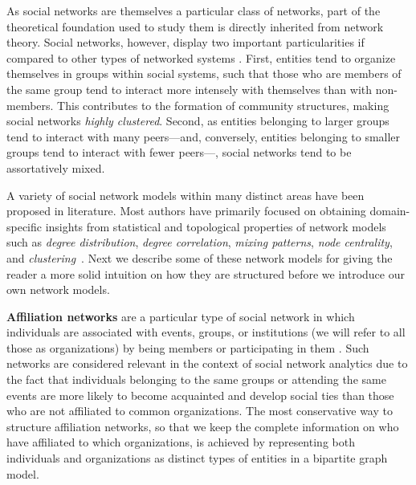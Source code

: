 As social networks are themselves a particular class of networks, part of the theoretical foundation used to study them is directly inherited from network theory.
%
Social networks, however, display two important particularities if compared to other types of networked systems \cite{Newman2003d}.
First, entities tend to organize themselves in groups within social systems, such that those who are members of the same group tend to interact more intensely with themselves than with non-members.
This contributes to the formation of community structures, making social networks \textit{highly clustered}.
Second, as entities belonging to larger groups tend to interact with many peers---and, conversely, entities belonging to smaller groups tend to interact with fewer peers---, social networks tend to be assortatively mixed.

A variety of social network models within many distinct areas have been proposed in literature.
Most authors have primarily focused on obtaining domain-specific insights from statistical and topological properties of network models such as \textit{degree distribution}, \textit{degree correlation}, \textit{mixing patterns}, \textit{node centrality}, and \textit{clustering}~\cite{Newman2003b}.
Next we describe some of these network models for giving the reader a more solid intuition on how they are structured before we introduce our own network models.


\textbf{Affiliation networks} are a particular type of social network in which individuals are associated with events, groups, or institutions (we will refer to all those as organizations) by being members or participating in them \cite{Borgatti2015}. 
%
Such networks are considered relevant in the context of social network analytics due to the fact that individuals belonging to the same groups or attending the same events are more likely to become acquainted and develop social ties than those who are not affiliated to common organizations.
%
The most conservative way to structure affiliation networks, so that we keep the complete information on who have affiliated to which organizations, is achieved by representing both individuals and organizations as distinct types of entities in a bipartite graph model.
 
